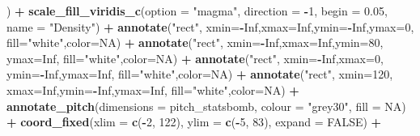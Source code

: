 \documentclass[
]{article}
\newenvironment{Shaded}{\begin{snugshade}}{\end{snugshade}}
\newcommand{\AttributeTok}[1]{\textcolor[rgb]{0.13,0.29,0.53}{#1}}
\newcommand{\ConstantTok}[1]{\textcolor[rgb]{0.56,0.35,0.01}{#1}}
\newcommand{\DecValTok}[1]{\textcolor[rgb]{0.00,0.00,0.81}{#1}}
\newcommand{\FloatTok}[1]{\textcolor[rgb]{0.00,0.00,0.81}{#1}}
\newcommand{\FunctionTok}[1]{\textcolor[rgb]{0.13,0.29,0.53}{\textbf{#1}}}
\newcommand{\NormalTok}[1]{#1}
\newcommand{\SpecialCharTok}[1]{\textcolor[rgb]{0.81,0.36,0.00}{\textbf{#1}}}
\newcommand{\StringTok}[1]{\textcolor[rgb]{0.31,0.60,0.02}{#1}}
\begin{document}
\begin{Shaded}
\begin{Highlighting}[]
\NormalTok{  ) }\SpecialCharTok{+}
  \FunctionTok{scale\_fill\_viridis\_c}\NormalTok{(}\AttributeTok{option =} \StringTok{"magma"}\NormalTok{, }\AttributeTok{direction =} \SpecialCharTok{{-}}\DecValTok{1}\NormalTok{, }\AttributeTok{begin =} \FloatTok{0.05}\NormalTok{,}
                       \AttributeTok{name =} \StringTok{"Density"}\NormalTok{) }\SpecialCharTok{+}
  \FunctionTok{annotate}\NormalTok{(}\StringTok{"rect"}\NormalTok{, }\AttributeTok{xmin=}\SpecialCharTok{{-}}\ConstantTok{Inf}\NormalTok{,}\AttributeTok{xmax=}\ConstantTok{Inf}\NormalTok{,}\AttributeTok{ymin=}\SpecialCharTok{{-}}\ConstantTok{Inf}\NormalTok{,}\AttributeTok{ymax=}\DecValTok{0}\NormalTok{,   }\AttributeTok{fill=}\StringTok{"white"}\NormalTok{,}\AttributeTok{color=}\ConstantTok{NA}\NormalTok{) }\SpecialCharTok{+}
  \FunctionTok{annotate}\NormalTok{(}\StringTok{"rect"}\NormalTok{, }\AttributeTok{xmin=}\SpecialCharTok{{-}}\ConstantTok{Inf}\NormalTok{,}\AttributeTok{xmax=}\ConstantTok{Inf}\NormalTok{,}\AttributeTok{ymin=}\DecValTok{80}\NormalTok{,  }\AttributeTok{ymax=}\ConstantTok{Inf}\NormalTok{, }\AttributeTok{fill=}\StringTok{"white"}\NormalTok{,}\AttributeTok{color=}\ConstantTok{NA}\NormalTok{) }\SpecialCharTok{+}
  \FunctionTok{annotate}\NormalTok{(}\StringTok{"rect"}\NormalTok{, }\AttributeTok{xmin=}\SpecialCharTok{{-}}\ConstantTok{Inf}\NormalTok{,}\AttributeTok{xmax=}\DecValTok{0}\NormalTok{,  }\AttributeTok{ymin=}\SpecialCharTok{{-}}\ConstantTok{Inf}\NormalTok{,}\AttributeTok{ymax=}\ConstantTok{Inf}\NormalTok{, }\AttributeTok{fill=}\StringTok{"white"}\NormalTok{,}\AttributeTok{color=}\ConstantTok{NA}\NormalTok{) }\SpecialCharTok{+}
  \FunctionTok{annotate}\NormalTok{(}\StringTok{"rect"}\NormalTok{, }\AttributeTok{xmin=}\DecValTok{120}\NormalTok{, }\AttributeTok{xmax=}\ConstantTok{Inf}\NormalTok{,}\AttributeTok{ymin=}\SpecialCharTok{{-}}\ConstantTok{Inf}\NormalTok{,}\AttributeTok{ymax=}\ConstantTok{Inf}\NormalTok{, }\AttributeTok{fill=}\StringTok{"white"}\NormalTok{,}\AttributeTok{color=}\ConstantTok{NA}\NormalTok{) }\SpecialCharTok{+}
  \FunctionTok{annotate\_pitch}\NormalTok{(}\AttributeTok{dimensions =}\NormalTok{ pitch\_statsbomb, }\AttributeTok{colour =} \StringTok{"grey30"}\NormalTok{, }\AttributeTok{fill =} \ConstantTok{NA}\NormalTok{) }\SpecialCharTok{+}
  \FunctionTok{coord\_fixed}\NormalTok{(}\AttributeTok{xlim =} \FunctionTok{c}\NormalTok{(}\SpecialCharTok{{-}}\DecValTok{2}\NormalTok{, }\DecValTok{122}\NormalTok{), }\AttributeTok{ylim =} \FunctionTok{c}\NormalTok{(}\SpecialCharTok{{-}}\DecValTok{5}\NormalTok{, }\DecValTok{83}\NormalTok{), }\AttributeTok{expand =} \ConstantTok{FALSE}\NormalTok{) }\SpecialCharTok{+}

\end{Highlighting}
\end{Shaded}
\end{document}
